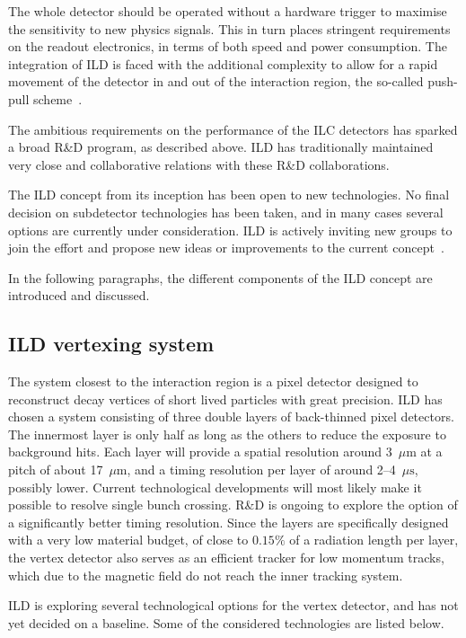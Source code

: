 The whole detector should be operated without a hardware trigger to maximise the sensitivity to new physics signals. This in turn places stringent requirements on the readout electronics, in terms of both speed and power consumption. The integration of ILD is faced with the additional complexity to allow for a rapid movement of the detector in and out of the interaction region, the so-called push-pull scheme~\cite{Parker:2008zza}. 

The ambitious requirements on the performance of the ILC detectors has sparked a broad R\&D program, as described above. ILD has traditionally maintained very close and collaborative relations with these R\&D collaborations. 

The ILD concept from its inception has been open to new technologies. 
No final decision on subdetector technologies has been taken, and in many cases several options are currently under consideration. ILD is actively inviting new groups to join the effort and propose new ideas or improvements to the current concept~\cite{Fujii:2020pxe}. 

In the following paragraphs, the different components of the ILD concept are introduced and discussed. 

\subsection{ILD vertexing system}
The system closest to the interaction region is a pixel detector designed to reconstruct decay vertices of short lived particles with great precision. ILD has chosen a system consisting of three double layers of back-thinned pixel detectors. The innermost layer is only half as long as the others to reduce the exposure to background hits. Each layer will provide a spatial resolution around  {3}~$\mu\mathrm{m}$ at a pitch of about {17}~$\mu\mathrm{m}$, and a timing resolution per layer of around 2--4~$\mu\mathrm{s}${, possibly lower}. Current technological developments will most likely make it possible to resolve single bunch crossing. R\&D is ongoing to explore the option of a significantly better timing resolution. Since the layers are specifically designed with a very low material budget, of close to $0.15\%$ of a radiation length per layer, the vertex detector also serves as an efficient tracker for low momentum tracks, which due to the magnetic field do not reach the inner tracking system.

ILD is exploring several technological options for the vertex detector, and has not yet decided on a baseline. 
Some of the considered technologies are listed below.

